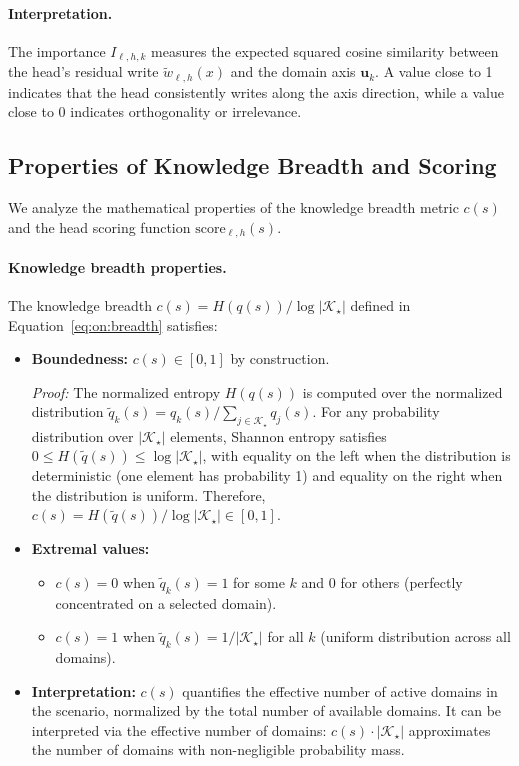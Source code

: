 \paragraph{Interpretation.}
The importance $I_{\ell,h,k}$ measures the expected squared cosine similarity between the head's residual write $\tilde{w}_{\ell,h}(x)$ and the domain axis $\mathbf{u}_k$.
A value close to 1 indicates that the head consistently writes along the axis direction, while a value close to 0 indicates orthogonality or irrelevance.

\subsection{Properties of Knowledge Breadth and Scoring}
\label{app:math_breadth_scoring}

We analyze the mathematical properties of the knowledge breadth metric $c(s)$ and the head scoring function $\mathrm{score}_{\ell,h}(s)$.

\paragraph{Knowledge breadth properties.}
The knowledge breadth $c(s) = H(q(s)) / \log |\mathcal{K}_\star|$ defined in Equation~\eqref{eq:on:breadth} satisfies:
\begin{itemize}
    \item \textbf{Boundedness:} $c(s) \in [0, 1]$ by construction.
    
    \emph{Proof:} The normalized entropy $H(q(s))$ is computed over the normalized distribution $\tilde{q}_k(s) = q_k(s) / \sum_{j \in \mathcal{K}_\star} q_j(s)$.
    For any probability distribution over $|\mathcal{K}_\star|$ elements, Shannon entropy satisfies $0 \leq H(\tilde{q}(s)) \leq \log |\mathcal{K}_\star|$, with equality on the left when the distribution is deterministic (one element has probability 1) and equality on the right when the distribution is uniform.
    Therefore, $c(s) = H(\tilde{q}(s)) / \log |\mathcal{K}_\star| \in [0, 1]$.
    
    \item \textbf{Extremal values:} 
    \begin{itemize}
        \item $c(s) = 0$ when $\tilde{q}_k(s) = 1$ for some $k$ and $0$ for others (perfectly concentrated on a selected domain).
        \item $c(s) = 1$ when $\tilde{q}_k(s) = 1/|\mathcal{K}_\star|$ for all $k$ (uniform distribution across all domains).
\end{itemize}
    
    \item \textbf{Interpretation:} $c(s)$ quantifies the effective number of active domains in the scenario, normalized by the total number of available domains.
    It can be interpreted via the effective number of domains: $c(s) \cdot |\mathcal{K}_\star|$ approximates the number of domains with non-negligible probability mass.
\end{itemize}

